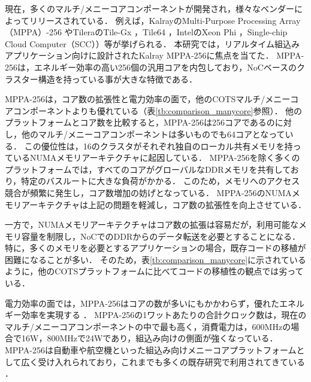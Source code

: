 \documentclass[submit,techrep]{ipsj_v2/UTF8/ipsj}
\begin{document}
現在，多くのマルチ/メニーコアコンポーネントが開発され，様々なベンダーによってリリースされている．
例えば，KalrayのMulti-Purpose Processing Array（MPPA）-256 \cite{de2014time}やTileraのTile-Gx \cite{ramey2011tile} \cite{schooler2010tile}，Tile64 \cite{bell2008tile64}，IntelのXeon Phi \cite{chrysos2014intel} \cite{chrysos2012intel}，Single-chip Cloud Computer（SCC）\cite{baron2010single}）等が挙げられる．
本研究では，リアルタイム組込みアプリケーション向けに設計されたKalray MPPA-256に焦点を当てた．
MPPA-256は，エネルギー効率の高い256個の汎用コアを内包しており，NoCベースのクラスター構造を持っている事が大きな特徴である．

MPPA-256は，コア数の拡張性と電力効率の面で，他のCOTSマルチ/メニーコアコンポーネントよりも優れている（表\ref{tb:comparison_manycore}参照）．
他のプラットフォームとコア数を比較すると，MPPA-256は256コアであるのに対し，他のマルチ/メニーコアコンポーネントは多いものでも64コアとなっている．
この優位性は，16のクラスタがそれぞれ独自のローカル共有メモリを持っているNUMAメモリアーキテクチャに起因している．
MPPA-256を除く多くのプラットフォームでは，すべてのコアがグローバルなDDRメモリを共有しており，特定のバスルートに大きな負荷がかかる．
このため，メモリへのアクセス競合が頻繁に発生し，コア数増加の妨げとなっている．
MPPA-256のNUMAメモリアーキテクチャは上記の問題を軽減し，コア数の拡張性を向上させている．

一方で，NUMAメモリアーキテクチャはコア数の拡張は容易だが，利用可能なメモリ容量を制限し，NoCでのDDRからのデータ転送を必要とすることになる．
特に，多くのメモリを必要とするアプリケーションの場合，既存コードの移植が困難になることが多い．
そのため，表\ref{tb:comparison_manycore}に示されているように，他のCOTSプラットフォームに比べてコードの移植性の観点では劣っている．

電力効率の面では，MPPA-256はコアの数が多いにもかかわらず，優れたエネルギー効率を実現する \cite{kanter2015kalray}．
MPPA-256の1ワットあたりの合計クロック数は，現在のマルチ/メニーコアコンポーネントの中で最も高く，消費電力は，600MHzの場合で16W，800MHzで24Wであり，組込み向けの側面が強くなっている．
MPPA-256は自動車や航空機といった組込み向けメニーコアプラットフォームとして広く受け入れられており，これまでも多くの既存研究で利用されてきている \cite{carle2014static} \cite{perret2016mapping} \cite{perret2016predictable}．
\end{document}
